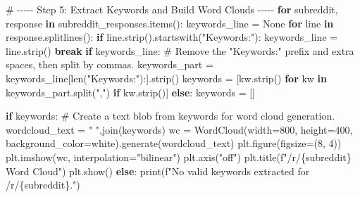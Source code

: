 \documentclass[
  12pt,
  letterpaper,
  DIV=11,
  numbers=noendperiod]{scrartcl}
\newenvironment{Shaded}{\begin{snugshade}}{\end{snugshade}}
\newcommand{\BuiltInTok}[1]{\textcolor[rgb]{0.00,0.23,0.31}{#1}}
\newcommand{\CommentTok}[1]{\textcolor[rgb]{0.37,0.37,0.37}{#1}}
\newcommand{\ControlFlowTok}[1]{\textcolor[rgb]{0.00,0.23,0.31}{\textbf{#1}}}
\newcommand{\DecValTok}[1]{\textcolor[rgb]{0.68,0.00,0.00}{#1}}
\newcommand{\KeywordTok}[1]{\textcolor[rgb]{0.00,0.23,0.31}{\textbf{#1}}}
\newcommand{\NormalTok}[1]{\textcolor[rgb]{0.00,0.23,0.31}{#1}}
\newcommand{\OperatorTok}[1]{\textcolor[rgb]{0.37,0.37,0.37}{#1}}
\newcommand{\SpecialCharTok}[1]{\textcolor[rgb]{0.37,0.37,0.37}{#1}}
\newcommand{\SpecialStringTok}[1]{\textcolor[rgb]{0.13,0.47,0.30}{#1}}
\newcommand{\StringTok}[1]{\textcolor[rgb]{0.13,0.47,0.30}{#1}}
\newcommand{\VariableTok}[1]{\textcolor[rgb]{0.07,0.07,0.07}{#1}}
\begin{document}
\begin{Shaded}
\begin{Highlighting}[]
\CommentTok{\# {-}{-}{-}{-}{-} Step 5: Extract Keywords and Build Word Clouds {-}{-}{-}{-}{-}}
\ControlFlowTok{for}\NormalTok{ subreddit, response }\KeywordTok{in}\NormalTok{ subreddit\_responses.items():}
\NormalTok{    keywords\_line }\OperatorTok{=} \VariableTok{None}
    \ControlFlowTok{for}\NormalTok{ line }\KeywordTok{in}\NormalTok{ response.splitlines():}
        \ControlFlowTok{if}\NormalTok{ line.strip().startswith(}\StringTok{"Keywords:"}\NormalTok{):}
\NormalTok{            keywords\_line }\OperatorTok{=}\NormalTok{ line.strip()}
            \ControlFlowTok{break}
    \ControlFlowTok{if}\NormalTok{ keywords\_line:}
        \CommentTok{\# Remove the "Keywords:" prefix and extra spaces, then split by commas.}
\NormalTok{        keywords\_part }\OperatorTok{=}\NormalTok{ keywords\_line[}\BuiltInTok{len}\NormalTok{(}\StringTok{"Keywords:"}\NormalTok{):].strip()}
\NormalTok{        keywords }\OperatorTok{=}\NormalTok{ [kw.strip() }\ControlFlowTok{for}\NormalTok{ kw }\KeywordTok{in}\NormalTok{ keywords\_part.split(}\StringTok{","}\NormalTok{) }\ControlFlowTok{if}\NormalTok{ kw.strip()]}
    \ControlFlowTok{else}\NormalTok{:}
\NormalTok{        keywords }\OperatorTok{=}\NormalTok{ []}
    
    \ControlFlowTok{if}\NormalTok{ keywords:}
        \CommentTok{\# Create a text blob from keywords for word cloud generation.}
\NormalTok{        wordcloud\_text }\OperatorTok{=} \StringTok{" "}\NormalTok{.join(keywords)}
\NormalTok{        wc }\OperatorTok{=}\NormalTok{ WordCloud(width}\OperatorTok{=}\DecValTok{800}\NormalTok{, height}\OperatorTok{=}\DecValTok{400}\NormalTok{, background\_color}\OperatorTok{=}\StringTok{\textquotesingle{}white\textquotesingle{}}\NormalTok{).generate(wordcloud\_text)}
\NormalTok{        plt.figure(figsize}\OperatorTok{=}\NormalTok{(}\DecValTok{8}\NormalTok{, }\DecValTok{4}\NormalTok{))}
\NormalTok{        plt.imshow(wc, interpolation}\OperatorTok{=}\StringTok{"bilinear"}\NormalTok{)}
\NormalTok{        plt.axis(}\StringTok{"off"}\NormalTok{)}
\NormalTok{        plt.title(}\SpecialStringTok{f"/r/}\SpecialCharTok{\{}\NormalTok{subreddit}\SpecialCharTok{\}}\SpecialStringTok{ Word Cloud"}\NormalTok{)}
\NormalTok{        plt.show()}
    \ControlFlowTok{else}\NormalTok{:}
        \BuiltInTok{print}\NormalTok{(}\SpecialStringTok{f"No valid keywords extracted for /r/}\SpecialCharTok{\{}\NormalTok{subreddit}\SpecialCharTok{\}}\SpecialStringTok{."}\NormalTok{)}
\end{Highlighting}
\end{Shaded}
\end{document}
